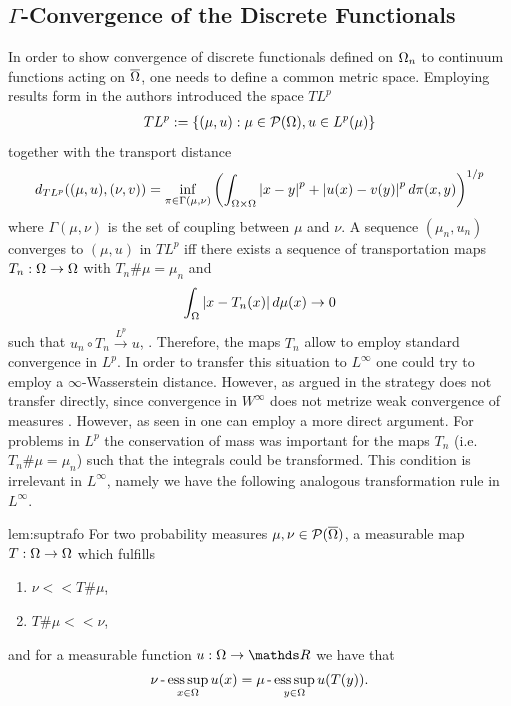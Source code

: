 \subsection{$\Gamma$-Convergence of the Discrete Functionals} In order to show convergence of discrete functionals defined on $\Omega_n$ to continuum functions acting on $\overline{\Omega}$, one needs to define a common metric space. Employing results form \cite{trillos2015rate} in \cite{GarcSlep15} the authors introduced the space $TL^p$
%
\begin{align*}
TL^p :=\left\{(\mu, u): \mu\in \mathcal{P}(\Omega), u\in L^p(\mu)\right\}
\end{align*}
%
together with the transport distance
%
\begin{align*}
d_{TL^p}((\mu, u), (\nu, v)) = \inf_{\pi\in \Gamma(\mu,\nu)}
\left(\int_{\Omega\times\Omega} \left|x-y\right|^p + \left|u(x) - v(y)\right|^p d\pi(x,y)\right)^{1/p}
\end{align*}
%
where $\Gamma(\mu,\nu)$ is the set of coupling between $\mu$ and $\nu$. A sequence $(\mu_n, u_n)$ converges to $(\mu,u)$ in $TL^p$ iff there exists a sequence of transportation maps $T_n:\Omega\to\Omega$ with $T_n\#\mu = \mu_n$ and 
%
\begin{align*}
\int_{\Omega} \left|x- T_n(x)\right| d\mu(x)\rightarrow 0
\end{align*}
%
such that $u_n\circ T_n \xrightarrow{L^p} u$, \cite[Prop. 3.12]{GarcSlep15}. Therefore, the maps $T_n$ allow to employ standard convergence in $L^p$. In order to transfer this situation to $L^\infty$ one could try to employ a $\infty$-Wasserstein distance. However, as argued in \cite{roith2022msc} the strategy does not transfer directly, since convergence in $W^\infty$ does not metrize weak convergence of measures \cite[Thm. 5.10]{santambrogio2015optimal}. However, as seen in \cite{roith2022continuum} one can employ a more direct argument. For problems in $L^p$ the conservation of mass was important for the maps $T_n$ (i.e. $T_n\#\mu = \mu_n$) such that the integrals could be transformed. This condition is irrelevant in $L^\infty$, namely we have the following analogous transformation rule in $L^\infty$.
%
\begin{lemma}{\cite[Lem. 2]{roith2022continuum}}{lem:suptrafo}
For two probability measures $\mu,\nu \in \mathcal{P}(\overline{\Omega})$, a measurable map 
$T:\Omega\rightarrow\Omega$ which fulfills
\begin{enumerate}[label=\upshape(\roman*)]
\item $\nu<<T\#\mu$,
\item $T\# \mu<<\nu$,
\end{enumerate}
and for a measurable function $u:\domain\rightarrow\R$ we have that
\begin{align*}
\nu\operatorname{-}\operatorname*{ess\,sup}_{x\in\Omega} u(x) = \mu\operatorname{-}\operatorname*{ess\,sup}_{y\in\Omega} u(T(y)).
\end{align*}
\end{lemma}
